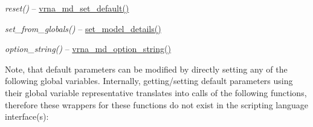 \begin{DoxyRefList}
\begin{DoxyItemize}
\item {\itshape reset()} -- \mbox{\hyperlink{group__model__details_ga8ac6ff84936282436f822644bf841f66}{vrna\+\_\+md\+\_\+set\+\_\+default()}}
\item {\itshape set\+\_\+from\+\_\+globals()} -- \mbox{\hyperlink{group__model__details_gabad896c3650d420f3f3ddefc69e2bceb}{set\+\_\+model\+\_\+details()}}
\item {\itshape option\+\_\+string()} -- \mbox{\hyperlink{group__model__details_ga3a7469f0725a849af6ba61a57dfd60ce}{vrna\+\_\+md\+\_\+option\+\_\+string()}}
\end{DoxyItemize}

Note, that default parameters can be modified by directly setting any of the following global variables. Internally, getting/setting default parameters using their global variable representative translates into calls of the following functions, therefore these wrappers for these functions do not exist in the scripting language interface(s)\+:



\end{DoxyRefList}
